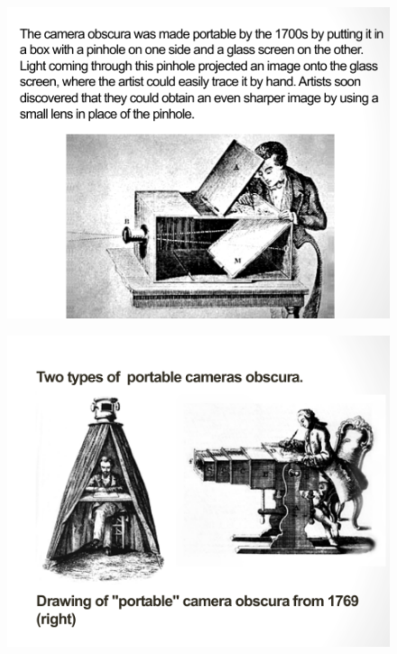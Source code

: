 \documentclass{beamer}
\begin{document}
\begin{frame}
	\begin{figure}
		\centering
		\includegraphics[scale=0.4]{71.jpg}
	\end{figure}
\end{frame}

\begin{frame}
	\begin{figure}
		\centering
		\includegraphics[scale=0.4]{72.jpg}
	\end{figure}
\end{frame}
\end{document}
